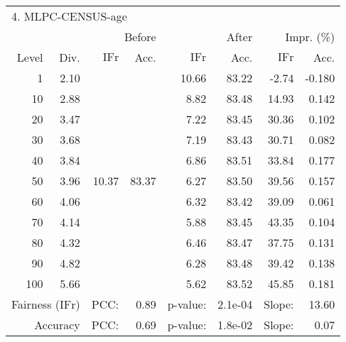 \begin{tabular}{rr||rr|rr|rr}
\multicolumn{4}{l}{4. MLPC-CENSUS-age} & \multicolumn{2}{c}{} & \multicolumn{2}{c}{}\\
 &  & \multicolumn{2}{r|}{Before} & \multicolumn{2}{r|}{After} & \multicolumn{2}{r}{Impr. (\%)}\\
Level & Div. & $\mathrm{IFr}$ & Acc. & $\mathrm{IFr}$ & Acc. & $\mathrm{IFr}$ & Acc.\\
\hline
1 & 2.10 & \multirow{11}{*}{10.37} & \multirow{11}{*}{83.37} & 10.66 & 83.22 & -2.74 & -0.180\\
10 & 2.88 &  &  & 8.82 & 83.48 & 14.93 & 0.142\\
20 & 3.47 &  &  & 7.22 & 83.45 & 30.36 & 0.102\\
30 & 3.68 &  &  & 7.19 & 83.43 & 30.71 & 0.082\\
40 & 3.84 &  &  & 6.86 & 83.51 & 33.84 & 0.177\\
50 & 3.96 &  &  & 6.27 & 83.50 & 39.56 & 0.157\\
60 & 4.06 &  &  & 6.32 & 83.42 & 39.09 & 0.061\\
70 & 4.14 &  &  & 5.88 & 83.45 & 43.35 & 0.104\\
80 & 4.32 &  &  & 6.46 & 83.47 & 37.75 & 0.131\\
90 & 4.82 &  &  & 6.28 & 83.48 & 39.42 & 0.138\\
100 & 5.66 &  &  & 5.62 & 83.52 & 45.85 & 0.181\\
\hline
\multicolumn{2}{r}{Fairness ($\mathrm{IFr}$)} & PCC: & \multicolumn{1}{r}{0.89} & p-value:  & \multicolumn{1}{r}{2.1e-04} & Slope:  & 13.60\\
\multicolumn{2}{r}{Accuracy} & PCC: & \multicolumn{1}{r}{0.69} & p-value:  & \multicolumn{1}{r}{1.8e-02} & Slope:  & 0.07\\
\end{tabular}